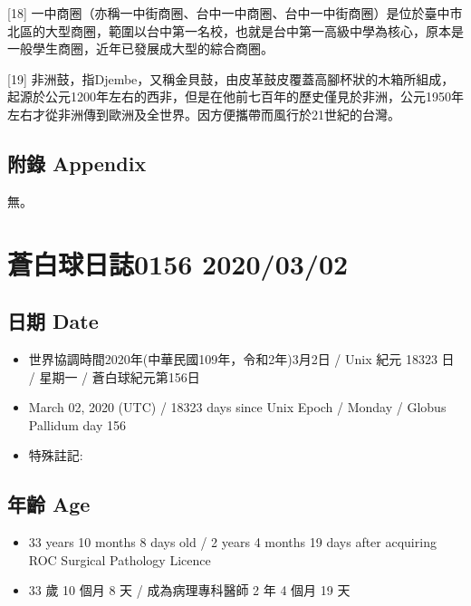 \documentclass[
]{article}
\providecommand{\tightlist}{%
  \setlength{\itemsep}{0pt}\setlength{\parskip}{0pt}}
\begin{document}
{[}18{]}
一中商圈（亦稱一中街商圈、台中一中商圈、台中一中街商圈）是位於臺中市北區的大型商圈，範圍以台中第一名校，也就是台中第一高級中學為核心，原本是一般學生商圈，近年已發展成大型的綜合商圈。

{[}19{]}
非洲鼓，指Djembe，又稱金貝鼓，由皮革鼓皮覆蓋高腳杯狀的木箱所組成，起源於公元1200年左右的西非，但是在他前七百年的歷史僅見於非洲，公元1950年左右才從非洲傳到歐洲及全世界。因方便攜帶而風行於21世紀的台灣。

\hypertarget{ux9644ux9304-appendix}{%
\subsection{附錄 Appendix}\label{ux9644ux9304-appendix}}

無。

\hypertarget{ux84bcux767dux7403ux65e5ux8a8c0156-20200302}{%
\section{蒼白球日誌0156
2020/03/02}\label{ux84bcux767dux7403ux65e5ux8a8c0156-20200302}}

\hypertarget{ux65e5ux671f-date-1}{%
\subsection{日期 Date}\label{ux65e5ux671f-date-1}}

\begin{itemize}
\tightlist
\item
  世界協調時間2020年(中華民國109年，令和2年)3月2日 / Unix 紀元 18323 日
  / 星期一 / 蒼白球紀元第156日
\item
  March 02, 2020 (UTC) / 18323 days since Unix Epoch / Monday / Globus
  Pallidum day 156
\item
  特殊註記:
\end{itemize}

\hypertarget{ux5e74ux9f61-age-1}{%
\subsection{年齡 Age}\label{ux5e74ux9f61-age-1}}

\begin{itemize}
\tightlist
\item
  33 years 10 months 8 days old / 2 years 4 months 19 days after
  acquiring ROC Surgical Pathology Licence
\item
  33 歲 10 個月 8 天 / 成為病理專科醫師 2 年 4 個月 19 天
\end{itemize}
\end{document}
